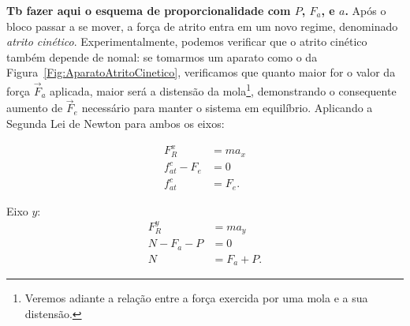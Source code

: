 \textbf{Tb fazer aqui o esquema de proporcionalidade com $P$, $F_a$, e $a$.}
Após o bloco passar a se mover, a força de atrito entra em um novo regime, denominado \emph{atrito cinético}. Experimentalmente, podemos verificar que o atrito cinético também depende de nomal: se tomarmos um aparato como o da Figura~\ref{Fig:AparatoAtritoCinetico}, verificamos que quanto maior for o valor da força $\vec{F}_a$ aplicada, maior será a distensão da mola\footnote{Veremos adiante a relação entre a força exercida por uma mola e a sua distensão.}, demonstrando o consequente aumento de $\vec{F}_e$ necessário para manter o sistema em equilíbrio. Aplicando a Segunda Lei de Newton para ambos os eixos:
\begin{description}
    \item[Eixo $x$:]
        \begin{align}
            F_R^x &= m a_x \\
            f_{at}^c - F_e &= 0 \\
            f_{at}^c &= F_e.
        \end{align}
    \item{Eixo $y$:}
        \begin{align}
            F_R^y &= m a_y \\
            N - F_a - P &= 0 \\
            N &= F_a + P.
        \end{align}
\end{description}

